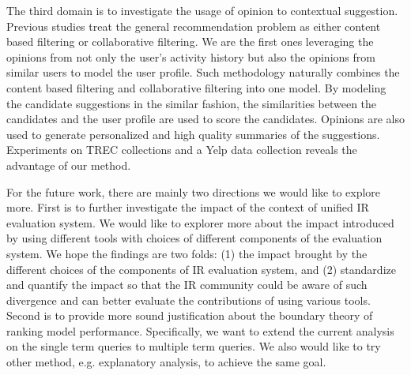 The third domain is to investigate the usage of opinion to contextual 
suggestion. Previous studies treat the general recommendation 
problem as either content based filtering or collaborative filtering. 
We are the first ones leveraging the opinions from not only the user's 
activity history but also the opinions from similar users to model the user 
profile. Such methodology naturally combines the content based filtering and 
collaborative filtering into one model. By modeling the candidate suggestions 
in the similar fashion, the similarities between the candidates and the user 
profile are used to score the candidates. Opinions are also used to generate 
personalized and high quality summaries of the suggestions. Experiments on 
TREC collections and a Yelp data collection reveals the advantage of our method.

For the future work, there are mainly two directions we would like to explore more. 
First is to further investigate the impact of the context of unified 
IR evaluation system. We would like to explorer more about the impact 
introduced by using different tools with choices of different components 
of the evaluation system. We hope the findings are two folds: 
(1) the impact brought by the different choices of the components of IR 
evaluation system, and (2) standardize and quantify the impact so that the IR 
community could be aware of such divergence and can better evaluate the 
contributions of using various tools. 
Second is to provide more sound justification about the boundary theory 
of ranking model performance. Specifically, we want to extend the current 
analysis on the single term queries to multiple term queries. We also would 
like to try other method, e.g. explanatory analysis, to achieve the same goal.















